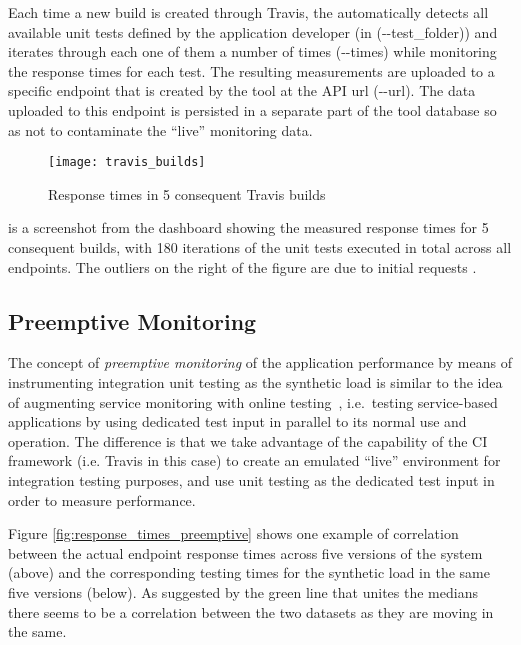   Each time a new build is created through Travis, the \tool automatically detects all available unit tests defined by the application developer (in (-{}-test\_folder)) and iterates through each one of them a number of times (-{}-times) while monitoring the response times for each test. The resulting measurements are uploaded to a specific endpoint that is created by the tool at the API url (-{}-url). The data uploaded to this endpoint is   persisted in a separate part of the tool database so as not to contaminate the ``live'' monitoring data. 

      \begin{figure}[h!]
        \centering
        \texttt{[image: travis\_builds]}
        \caption{Response times in 5 consequent Travis builds}
        \label{fig:builds}
      \end{figure}

   is a screenshot from the dashboard showing the measured response times for 5 consequent builds, with 180 iterations of the unit tests executed in total across all endpoints. The outliers on the right of the figure are due to initial requests .  
  


  \subsection*{Preemptive Monitoring}
  The concept of {\em preemptive monitoring} of the application performance by means of instrumenting integration unit testing as the synthetic load is similar to the idea of augmenting service monitoring with online testing~\cite{metzger2010proactive}, i.e.~testing service-based applications by using dedicated test input in parallel to its normal use and operation. The difference is that we take advantage of the capability of the CI framework (i.e. Travis in this case) to create an emulated ``live'' environment for integration testing purposes, and use unit testing as the dedicated test input in order to measure performance. 
  

  Figure \ref{fig:response_times_preemptive} shows one example of correlation between the actual endpoint response times across five versions of the system (above) and the corresponding testing times for the synthetic load in the same five versions (below). As suggested by the green line that unites the medians there seems to be a correlation between the two datasets as they are moving in the same. 


